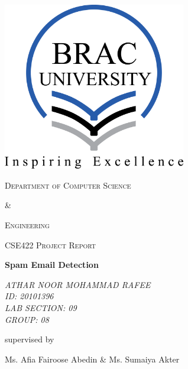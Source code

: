 \documentclass{scrartcl}
\begin{document}
    \begin{titlepage}
        \centering
        \includegraphics[width=0.6\textwidth]{Graphics/images/bracu_logo}\par
        \vspace{2cm}
        {\scshape\LARGE Department of Computer Science \par}  %
        {\scshape\LARGE \& \par}                %
        {\scshape\LARGE Engineering \par}      %
        \vspace{1cm}
        {\scshape\Large CSE422 Project Report\par}
        \vfill

        {\huge\bfseries Spam Email Detection\par}
        \vfill

        {\Large\itshape ATHAR NOOR MOHAMMAD RAFEE\\ ID: 20101396 \\ LAB SECTION: 09\\ GROUP: 08}\par
        \vspace{1.5cm}

        \vfill
        supervised by\par
        Ms. Afia Fairoose Abedin \& Ms. Sumaiya Akter


        \vfill
    \end{titlepage}
\end{document}
